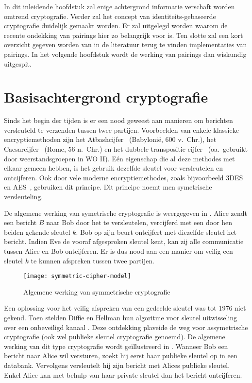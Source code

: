 
 In dit inleidende hoofdstuk zal enige achtergrond informatie verschaft worden omtrend cryptografie. Verder zal het concept van identiteits-gebaseerde cryptografie duidelijk gemaakt worden. Er zal uitgelegd worden waarom de recente ondekking van pairings hier zo belangrijk voor is. Ten slotte zal een kort overzicht gegeven worden van in de literatuur terug te vinden implementaties van pairings. In het volgende hoofdstuk wordt de werking van pairings dan wiskundig uitgespit.
\section{Basisachtergrond cryptografie}

Sinds het begin der tijden is er een nood geweest aan manieren om berichten versleuteld te verzenden tussen twee partijen. Voorbeelden van enkele klassieke encryptiemethoden zijn het Atbashcijfer~\cite{athbash} (Babyloni\"e, 600 v.\ Chr.), het Caesarcijfer~\cite{caesar} (Rome, 56 n.\ Chr.) en het dubbele transpositie cijfer~\cite{kahn} (oa.\ gebruikt door weerstandsgroepen in WO II). E\'en eigenschap die al deze methodes met elkaar gemeen hebben, is het gebruik dezelfde sleutel voor versleutelen en ontcijferen. Ook door vele moderne encryptiemethodes, zoals bijvoorbeeld 3DES~\cite{3des} en AES~\cite{aes}, gebruiken dit principe. Dit principe noemt men symetrische versleuteling.

De algemene werking van symetrische cryptografie is weergegeven in . Alice zendt een bericht $B$ naar Bob door het te versleutelen, vercijferd met een door hen beiden gekende sleutel $k$. Bob op zijn beurt ontcijfert met diezelfde sleutel het bericht. Indien Eve de vooraf afgesproken sleutel kent, kan zij alle communicatie tussen Alice en Bob ontcijferen. Er is dus nood aan een manier om veilig een sleutel $k$ te kunnen afspreken tussen twee partijen.

\begin{figure}[h]
	\centering
		\texttt{[image: symmetric-cipher-model]}
		\caption{Algemene werking van symmetrische cryptografie\label{fig-encryptie-applicaties-sym-cipher}}
\end{figure}

Een oplossing voor het veilig afspreken van een gedeelde sleutel was tot 1976 niet gekend. Toen stelden Diffie en Hellman hun algoritme voor sleutel uitwisseling over een onbeveiligd kanaal \cite{diffie-hellman}. Deze ontdekking plaveide de weg voor assymetrische cryptografie (ook wel publieke sleutel cryptografie genoemd). De algemene werking van dit type cryptografie wordt ge\"illustreerd in . Wanneer Bob een bericht naar Alice wil versturen, zoekt hij eerst haar publieke sleutel op in een databank. Vervolgens versleutelt hij zijn bericht met Alices publieke sleutel. Enkel Alice kan met behulp van haar private sleutel dan het bericht ontcijferen.

